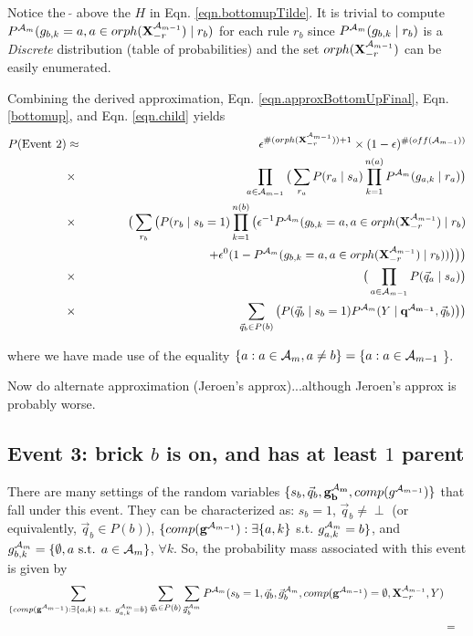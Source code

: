 \documentclass[11pt]{article}
\newcommand{\A}{{\cal A}}
\newcommand{\X}{\mathbf{X}}
\newcommand{\XrmPrev}{\X^{\A_{m-1}}_{-r}}
\newcommand{\Am}{\A_{m}}
\newcommand{\gcompPrev}{comp(\mathbf{g}^{\A_{m-1}})}
\newcommand{\qb}{\vec{q}_b}
\newcommand{\qa}{\vec{q}_a}
\begin{document}
Notice the $~\tilde{}$ above the $H$ in Eqn. \ref{eqn.bottomupTilde}. It is trivial to compute $P^{\Am}(g_{b,k} = a, a \in orph(\XrmPrev) \mid r_b)$ for each rule $r_b$ since $P^{\Am}(g_{b,k} \mid r_b)$ is a \emph{Discrete} distribution (table of probabilities) and the set $orph(\XrmPrev)$ can be easily enumerated.

Combining the derived approximation, Eqn. \ref{eqn.approxBottomUpFinal}, Eqn. \ref{bottomup}, and Eqn. \ref{eqn.child} yields
%
\begin{eqnarray}
P(\text{Event 2}) &\approx& \epsilon^{\#(orph(\XrmPrev)) + 1} \times (1-\epsilon)^{\#(off(\A_{m-1}))} \nonumber \\
%
&\times& \prod_{a \in {\A_{m-1}}} \big( \sum_{r_a} P(r_a \mid s_a) \prod_{k=1}^{n(a)} P^{\Am}(g_{a,k} \mid r_a) \big) \nonumber  \\
%
&\times&  \big( \sum_{r_b} \big( P(r_b \mid s_b = 1) \prod_{k=1}^{n(b)} \big ( \epsilon^{-1}P^{\Am}(g_{b,k} = a, a \in orph(\XrmPrev) \mid r_b) \\ 
%
& & \qquad \qquad \qquad \qquad \qquad + \epsilon^{0}(1-P^{\Am}(g_{b,k} = a, a \in orph(\XrmPrev) \mid r_b)) \big) \big) \big) \nonumber \\
%
&\times& \big( \prod_{a \in {\A_{m-1}}} P(\qa \mid s_a) \big) \nonumber \\
&\times& \sum_{\vec{q}_b \in P(b)} \big( P(\qb \mid s_b = 1) P^{\Am}(Y \mid \mathbf{q^{\A_{m-1}}}, \vec{q}_b) \big) \big) \nonumber 
\end{eqnarray} 

where we have made use of the equality $\{ a: a \in \Am, a \neq b\} = \{a : a \in \A_{m-1}$ \}.

Now do alternate approximation (Jeroen's approx)...although Jeroen's approx is probably worse.

\subsection*{Event 3: brick $b$ is on, and has at least $1$ parent}

There are many settings of the random variables $\{s_b, \qb, \mathbf{g^{\Am}_b}, comp(g^{\A_{m-1}})\}$ that fall under this event. They can be characterized as: $s_b=1$, $\qb \neq \perp$ (or equivalently, $\qb \in P(b)$), $\{\gcompPrev : \exists \{a,k\}$ s.t. $ g^{\Am}_{a,k} = b \}$, and $g^{\Am}_{b,k} = \{\emptyset, a \text{ s.t. } a \in {\Am}\}$, $\forall k$. So, the probability mass associated with this event is given by
\begin{eqnarray}
\sum_{\{\gcompPrev : \exists \{a,k\} \text{ s.t. } g^{\Am}_{a,k} = b \}} \sum_{\vec{q}_b \in P(b)} \sum_{\vec{g}^{\Am}_{b}} P^{\Am}(s_b=1, \vec{q}_b, \vec{g}^{\Am}_{b}, \gcompPrev = \emptyset, \XrmPrev, Y) \\
&=&
\end{eqnarray}

\end{document}

